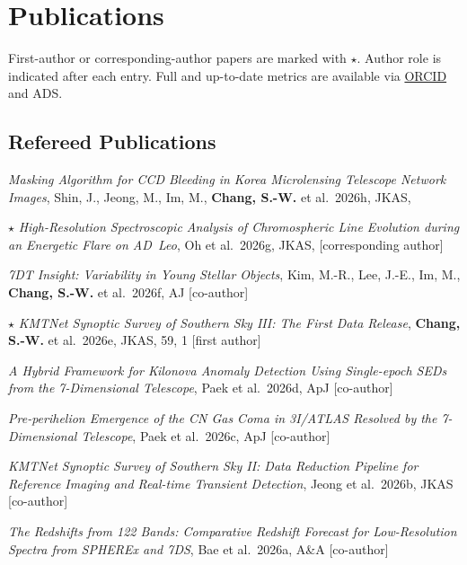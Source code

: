 \documentclass[letterpaper,11pt]{article}
\begin{document}
\section*{Publications}
First-author or corresponding-author papers are marked with $\star$. Author role is
indicated after each entry. Full and up-to-date metrics are available via
\href{https://orcid.org/0000-0002-3118-8275}{ORCID} and ADS.

\subsection*{Refereed Publications}
{\sloppy
\begin{etaremune}
\item \emph{Masking Algorithm for CCD Bleeding in Korea Microlensing Telescope Network
Images}, Shin, J., Jeong, M., Im, M., \textbf{Chang, S.-W.} et al.\ 2026h, JKAS,

\item $\star$ \emph{High-Resolution Spectroscopic Analysis of Chromospheric Line Evolution
during an Energetic Flare on AD~Leo}, Oh et al.\ 2026g, JKAS, [corresponding author]

\item \emph{7DT Insight: Variability in Young Stellar Objects}, Kim, M.-R., Lee, J.-E.,
Im, M., \textbf{Chang, S.-W.} et al.\ 2026f, AJ [co-author] %

\item $\star$ \emph{KMTNet Synoptic Survey of Southern Sky III: The First Data Release},
\textbf{Chang, S.-W.} et al.\ 2026e, JKAS, 59, 1
[first author] 
\item \emph{A Hybrid Framework for Kilonova Anomaly Detection Using Single-epoch SEDs from the 7-Dimensional Telescope}, Paek et al.\ 2026d, ApJ
[co-author] 

\item \emph{Pre-perihelion Emergence of the CN Gas Coma in 3I/ATLAS Resolved by the
7-Dimensional Telescope}, Paek et al.\ 2026c, ApJ [co-author] 

\item \emph{KMTNet Synoptic Survey of Southern Sky II: Data Reduction Pipeline for
Reference Imaging and Real-time Transient Detection}, Jeong et al.\ 2026b, JKAS
[co-author]

\item \emph{The Redshifts from 122 Bands: Comparative Redshift Forecast for Low-Resolution
Spectra from SPHEREx and 7DS}, Bae et al.\ 2026a, A\&A [co-author] 


\end{etaremune}}
\end{document}
